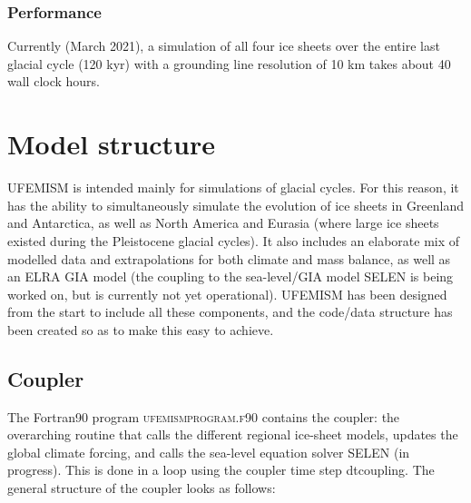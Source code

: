 \documentclass{article}
\begin{document}
\subsubsection{Performance}

Currently (March 2021), a simulation of all four ice sheets over the entire last glacial cycle (120 kyr) with a grounding line resolution of 10 km takes about 40 wall clock hours.

\newpage
\section{Model structure}

UFEMISM is intended mainly for simulations of glacial cycles. For this reason, it has the ability to simultaneously simulate the evolution of ice sheets in Greenland and Antarctica, as well as North America and Eurasia (where large ice sheets existed during the Pleistocene glacial cycles). It also includes an elaborate mix of modelled data and extrapolations for both climate and mass balance, as well as an ELRA GIA model (the coupling to the sea-level/GIA model SELEN is being worked on, but is currently not yet operational). UFEMISM has been designed from the start to include all these components, and the code/data structure has been created so as to make this easy to achieve.

\subsection{Coupler}

The Fortran90 program \textsc{ufemism\textunderscore program.f90} contains the coupler: the overarching routine that calls the different regional ice-sheet models, updates the global climate forcing, and calls the sea-level equation solver SELEN (in progress). This is done in a loop using the coupler time step dt\textunderscore coupling. The general structure of the coupler looks as follows:
\end{document}
